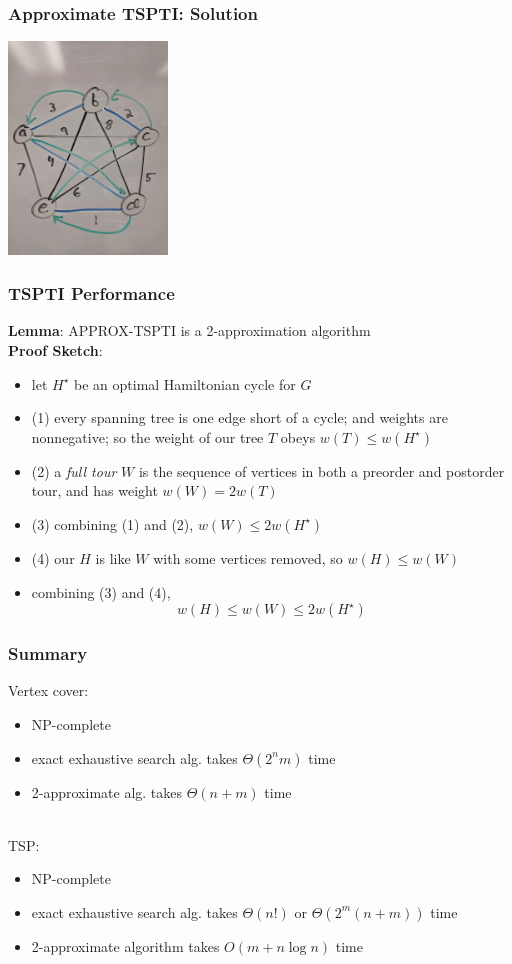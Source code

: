 \documentclass[10pt,aspectratio=169]{beamer}
\newcommand{\stanza}{ \\~\ }
\begin{document}
  \begin{frame} \frametitle{Approximate TSPTI: Solution}
    \begin{center}
      \includegraphics[height=160pt]{13-tspti-output.jpg}
    \end{center}
  \end{frame}
  
  \begin{frame} \frametitle{TSPTI Performance}
  \textbf{Lemma}: APPROX-TSPTI is a 2-approximation algorithm \\
  \textbf{Proof Sketch}:
  \begin{itemize}
    \item let $H^\star$ be an optimal Hamiltonian cycle for $G$
    \item (1) every spanning tree is one edge short of a cycle; and weights are nonnegative;
      so the weight of our tree $T$ obeys $w(T) \leq w(H^\star)$
    \item (2) a \emph{full tour} $W$ is the sequence of vertices in both a preorder and postorder
      tour, and has weight $w(W) = 2 w(T)$
    \item (3) combining (1) and (2), $w(W) \leq 2 w(H^\star)$
    \item (4) our $H$ is like $W$ with some vertices removed, so $w(H) \leq w(W)$
    \item combining (3) and (4),
      \[ w(H) \leq w(W) \leq 2 w(H^\star) \]
  \end{itemize}
  \end{frame}
  
  \begin{frame} \frametitle{Summary}
  Vertex cover:
  \begin{itemize}
    \item NP-complete
    \item exact exhaustive search alg. takes $\Theta(2^n m)$ time
    \item 2-approximate alg. takes $\Theta(n+m)$ time \stanza
  \end{itemize}
  
  TSP:
  \begin{itemize}
    \item NP-complete
    \item exact exhaustive search alg. takes $\Theta(n!)$ or $\Theta(2^m(n+m))$ time
    \item 2-approximate algorithm takes $O(m + n \log n)$ time
  \end{itemize}
  \end{frame}
\end{document}

